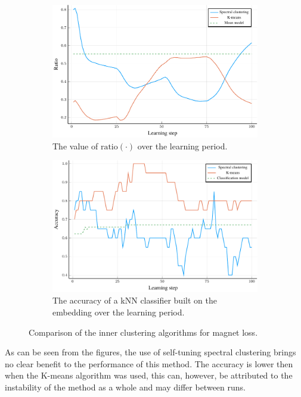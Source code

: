 \begin{figure}[h]
  \centering
  \begin{subfigure}[b]{0.49\textwidth}
    \centering
    \includegraphics[width=\textwidth]{images/magnet-spectral/ratio/magnet-spectral-ratio.pdf}
    \caption{The value of \( \mathrm{ratio} \left( \cdot \right) \) over the learning period.}
  \end{subfigure}
  \hfill
  \begin{subfigure}[b]{0.49\textwidth}
    \centering
    \includegraphics[width=\textwidth]{images/magnet-spectral/accuracy/magnet-spectral-accuracy.pdf}
    \caption{The accuracy of a kNN classifier built on the embedding over the learning period.}
  \end{subfigure}
  \caption{Comparison of the inner clustering algorithms for magnet loss.}\label{fig:magnet-spectral}
\end{figure}

As can be seen from the figures, the use of self-tuning spectral clustering brings no clear benefit to the performance of this method. The accuracy is lower then when the K-means algorithm was used, this can, however, be attributed to the instability of the method as a whole and may differ between runs.
